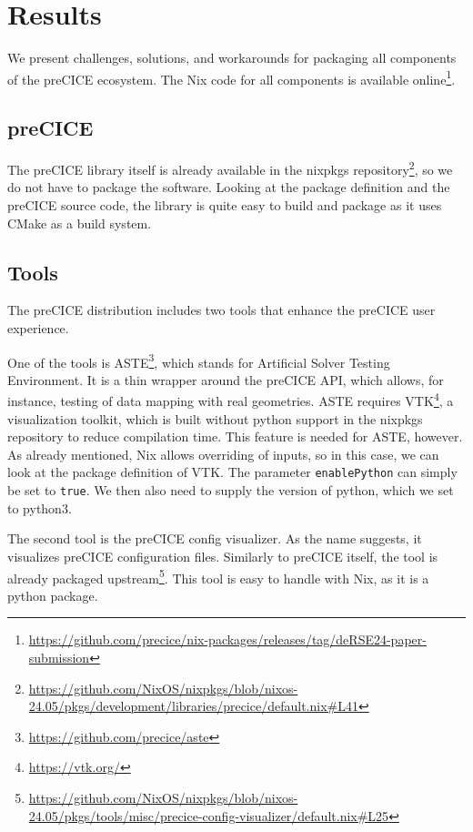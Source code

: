 \documentclass{eceasst}
\begin{document}
\section{Results}
\label{sec:results}

We present challenges, solutions, and workarounds for packaging all components of the preCICE ecosystem.
The Nix code for all components is available online\footnote{\url{https://github.com/precice/nix-packages/releases/tag/deRSE24-paper-submission}}.

\subsection{preCICE}

The preCICE library itself is already available in the nixpkgs repository\footnote{\url{https://github.com/NixOS/nixpkgs/blob/nixos-24.05/pkgs/development/libraries/precice/default.nix\#L41}}, so we do not have to package the software.
Looking at the package definition and the preCICE source code, the library is quite easy to build and package as it uses CMake as a build system.

\subsection{Tools}

The preCICE distribution includes two tools that enhance the preCICE user experience.

One of the tools is ASTE\footnote{\url{https://github.com/precice/aste}}, which stands for Artificial Solver Testing Environment. It is a thin wrapper around the preCICE API, which allows, for instance, testing of data mapping with real geometries.
ASTE requires VTK\footnote{\url{https://vtk.org/}}, a visualization toolkit, which is built without python support in the nixpkgs repository to reduce compilation time.
This feature is needed for ASTE, however.
As already mentioned, Nix allows overriding of inputs, so in this case, we can look at the package definition of VTK.
The parameter \texttt{enablePython} can simply be set to \texttt{true}. We then also need to supply the version of python, which we set to python3.

The second tool is the preCICE config visualizer.
As the name suggests, it visualizes preCICE configuration files.
Similarly to preCICE itself, the tool is already packaged upstream\footnote{\url{https://github.com/NixOS/nixpkgs/blob/nixos-24.05/pkgs/tools/misc/precice-config-visualizer/default.nix\#L25}}.
This tool is easy to handle with Nix, as it is a python package.
\end{document}
